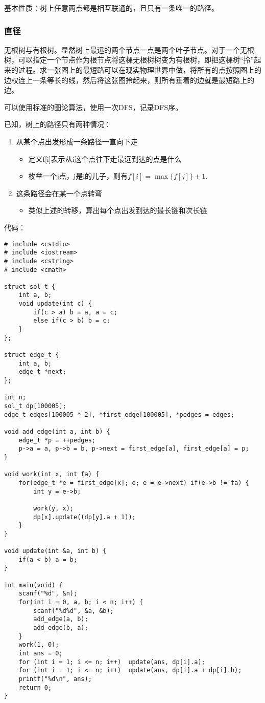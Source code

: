 \documentclass{article}
\begin{document}
基本性质：树上任意两点都是相互联通的，且只有一条唯一的路径。
\subsubsection{直径}
无根树与有根树。显然树上最远的两个节点一点是两个叶子节点。对于一个无根树，可以指定一个节点作为根节点将这棵无根树树变为有根树，即把这棵树“拎”起来的过程。求一张图上的最短路可以在现实物理世界中做，将所有的点按照图上的边权连上一条等长的线，然后将这张图拎起来，则所有垂着的边就是最短路上的边。

可以使用标准的图论算法，使用一次DFS，记录DFS序。

已知，树上的路径只有两种情况：
\begin{enumerate}
    \item{从某个点出发形成一条路径一直向下走}
    \begin{itemize}
        \item{定义f[i]表示从i这个点往下走最远到达的点是什么}
        \item{枚举一个j点，j是i的儿子，则有$f[i]=\max\{f[j]\}+1$}.
    \end{itemize}
    \item{这条路径会在某一个点转弯}
    \begin{itemize}
        \item{类似上述的转移，算出每个点出发到达的最长链和次长链}
    \end{itemize}
\end{enumerate}
代码：
\begin{verbatim}
# include <cstdio>
# include <iostream>
# include <cstring>
# include <cmath>

struct sol_t {
    int a, b;
    void update(int c) {
        if(c > a) b = a, a = c;
        else if(c > b) b = c;
    }
};

struct edge_t {
    int a, b;
    edge_t *next;
};

int n;
sol_t dp[100005];
edge_t edges[100005 * 2], *first_edge[100005], *pedges = edges;

void add_edge(int a, int b) {
    edge_t *p = ++pedges;
    p->a = a, p->b = b, p->next = first_edge[a], first_edge[a] = p;
}

void work(int x, int fa) {
    for(edge_t *e = first_edge[x]; e; e = e->next) if(e->b != fa) {
        int y = e->b;

        work(y, x);
        dp[x].update((dp[y].a + 1));
    }
}

void update(int &a, int b) {
    if(a < b) a = b;
}

int main(void) {
    scanf("%d", &n);
    for(int i = 0, a, b; i < n; i++) {
        scanf("%d%d", &a, &b);
        add_edge(a, b);
        add_edge(b, a);
    }
    work(1, 0);
    int ans = 0;
    for (int i = 1; i <= n; i++)  update(ans, dp[i].a);
    for (int i = 1; i <= n; i++)  update(ans, dp[i].a + dp[i].b);
    printf("%d\n", ans);
    return 0;
}
\end{verbatim}
\end{document}
